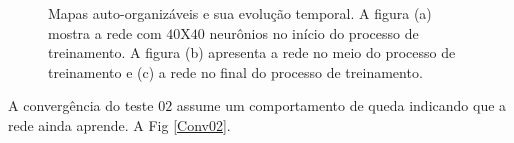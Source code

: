 \begin{figure}[H]
	\centering
	\qquad
	\qquad
	\qquad
	\caption{Mapas auto-organizáveis e sua evolução temporal. A figura (a) mostra a rede com $40$X$40$ neurônios no início do processo de treinamento. A figura (b) apresenta a rede no meio do processo de treinamento e (c) a rede no final do processo de treinamento.}
	\label{SOMt02}
\end{figure}

A convergência do teste $02$ assume um comportamento de queda indicando que a rede ainda aprende. A Fig \ref{Conv02}. 


